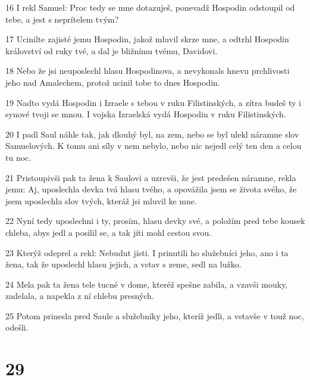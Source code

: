 \par 16 I rekl Samuel: Proc tedy se mne dotazuješ, ponevadž Hospodin odstoupil od tebe, a jest s neprítelem tvým?
\par 17 Ucinilte zajisté jemu Hospodin, jakož mluvil skrze mne, a odtrhl Hospodin království od ruky tvé, a dal je bližnímu tvému, Davidovi.
\par 18 Nebo že jsi neuposlechl hlasu Hospodinova, a nevykonals hnevu prchlivosti jeho nad Amalechem, protož ucinil tobe to dnes Hospodin.
\par 19 Nadto vydá Hospodin i Izraele s tebou v ruku Filistinských, a zítra budeš ty i synové tvoji se mnou. I vojska Izraelská vydá Hospodin v ruku Filistinských.
\par 20 I padl Saul náhle tak, jak dlouhý byl, na zem, nebo se byl ulekl náramne slov Samuelových. K tomu ani síly v nem nebylo, nebo nic nejedl celý ten den a celou tu noc.
\par 21 Pristoupivši pak ta žena k Saulovi a uzrevši, že jest predešen náramne, rekla jemu: Aj, uposlechla devka tvá hlasu tvého, a opovážila jsem se života svého, že jsem uposlechla slov tvých, kteráž jsi mluvil ke mne.
\par 22 Nyní tedy uposlechni i ty, prosím, hlasu devky své, a položím pred tebe kousek chleba, abys jedl a posilil se, a tak jíti mohl cestou svou.
\par 23 Kterýž odeprel a rekl: Nebudut jísti. I prinutili ho služebníci jeho, ano i ta žena, tak že uposlechl hlasu jejich, a vstav s zeme, sedl na lužko.
\par 24 Mela pak ta žena tele tucné v dome, kteréž spešne zabila, a vzavši mouky, zadelala, a napekla z ní chlebu presných.
\par 25 Potom prinesla pred Saule a služebníky jeho, kteríž jedli, a vstavše v touž noc, odešli.

\chapter{29}

